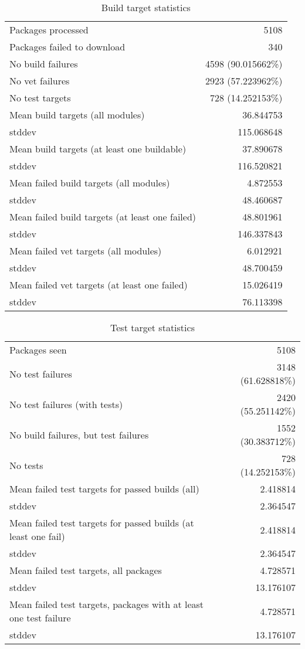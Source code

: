 \begin{table}[ht]
\caption{Build target statistics}
\label{table:build}
\begin{tabular}{|l|r|}
 \hline
  Packages processed & 5108 \\
  Packages failed to download & 340 \\
  No build failures & 4598 (90.015662\%) \\
  No vet failures & 2923 (57.223962\%) \\
  No test targets & 728 (14.252153\%) \\
 \hline
  Mean build targets (all modules)& 36.844753 \\
  stddev & 115.068648 \\
 \hline
  Mean build targets (at least one buildable)& 37.890678 \\
  stddev & 116.520821 \\
 \hline
  Mean failed build targets (all modules)& 4.872553 \\
  stddev & 48.460687 \\
 \hline
  Mean failed build targets (at least one failed)& 48.801961 \\
  stddev & 146.337843 \\
 \hline
  Mean failed vet targets (all modules)& 6.012921 \\
  stddev & 48.700459 \\
 \hline
  Mean failed vet targets (at least one failed)& 15.026419 \\
  stddev & 76.113398 \\
 \hline
\end{tabular}
\end{table}

\begin{table}[ht]
\caption{Test target statistics}
\label{table:test}
\begin{tabular}{|l|r|}
 \hline
  Packages seen & 5108 \\
  No test failures & 3148 (61.628818\%) \\
  No test failures (with tests) & 2420 (55.251142\%) \\
  No build failures, but test failures & 1552 (30.383712\%) \\
  No tests & 728 (14.252153\%) \\
 \hline
  Mean failed test targets for passed builds (all) & 2.418814 \\
  stddev & 2.364547 \\
 \hline
  Mean failed test targets for passed builds (at least one fail) & 2.418814 \\
  stddev & 2.364547 \\
 \hline
  Mean failed test targets, all packages& 4.728571 \\
  stddev & 13.176107 \\
 \hline
  Mean failed test targets, packages with at least one test failure& 4.728571 \\
  stddev & 13.176107 \\
 \hline
\end{tabular}
\end{table}

